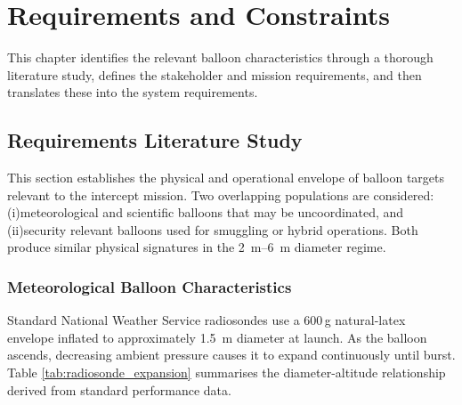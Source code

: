 \chapter{Requirements and Constraints}
\label{ch:requirements}


 
This chapter identifies the relevant balloon characteristics through a thorough literature study, defines the stakeholder and mission requirements, and then translates these into the system requirements. 
\vspace{-10pt}
\section{Requirements Literature Study}
\label{sec:balloon_targets}
 
This section establishes the physical and operational envelope of balloon targets relevant to the intercept mission. Two overlapping populations are considered: (i)meteorological and scientific balloons that may be uncoordinated, and (ii)security relevant balloons used for smuggling or hybrid operations. Both produce similar physical signatures in the \SIrange{2}{6}{\metre} diameter regime.
 
\vspace{-10pt}
\subsection{Meteorological Balloon Characteristics}
\label{subsec:met_balloons}
 
Standard National Weather Service radiosondes use a 600\,g natural-latex envelope inflated to approximately \SI{1.5}{\metre} diameter at launch. As the balloon ascends, decreasing ambient pressure causes it to expand continuously until burst. Table \ref{tab:radiosonde_expansion} summarises the diameter-altitude relationship derived from standard performance data.
 
